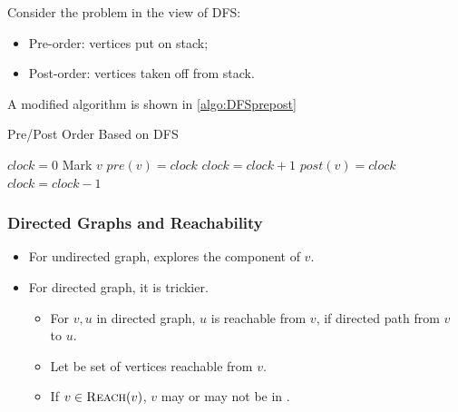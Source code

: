 Consider the problem in the view of DFS:
\begin{itemize}
    \item Pre-order: vertices put on stack;
    \item Post-order: vertices taken off from stack.
\end{itemize}

A modified algorithm is shown in \cref{algo:DFSprepost}
\begin{algorithm}[H]
    \caption{Pre/Post Order Based on DFS}\label{algo:DFSprepost}
    \begin{algorithmic}[1]
            \State $clock = 0$
                    \State{}
                \EndIf
            \EndFor
        \EndProcedure
            \State Mark $v$
            \State {}
                    \State{}
                \EndIf
            \EndFor
            \State{}
        \EndProcedure
            \State $pre(v) = clock$
            \State $clock = clock + 1$
        \EndProcedure
            \State $post(v) = clock$
            \State $clock = clock - 1$
        \EndProcedure
    \end{algorithmic}
\end{algorithm}

\subsubsection{Directed Graphs and Reachability}
\begin{itemize}
    \item For undirected graph,  explores the component of $v$.
    \item For directed graph, it is trickier.
        \begin{itemize}
            \item For $v,u$ in directed graph, $u$ is reachable from $v$,
                if directed path from $v$ to $u$.
            \item Let  be set of vertices
                reachable from $v$.
            \item If $v \in \textsc{Reach} (v)$, $v$ may or may not be in
                .
        \end{itemize}
\end{itemize}


